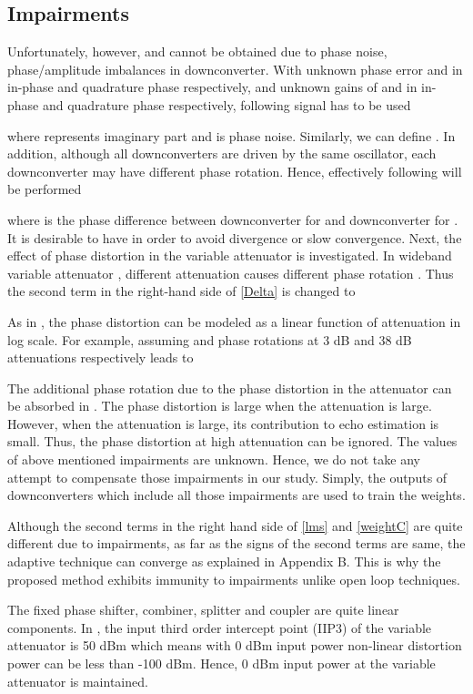 \documentclass[twocolumn]{IEEEtran}
\begin{document}
\subsection{Impairments}

Unfortunately, however,  and  cannot be
obtained due to phase noise, phase/amplitude imbalances in
downconverter. With unknown phase error  and
 in in-phase and quadrature phase respectively, and
unknown gains of  and  in in-phase and quadrature
phase respectively, following signal has to be used


where  represents
imaginary part and  is phase noise. Similarly, we can
define . In addition, although all
downconverters are driven by the same oscillator, each downconverter
may have different phase rotation. Hence, effectively following will
be performed


where  is the phase difference between downconverter
for  and downconverter for . It is desirable to
have  in order to avoid divergence or slow
convergence. Next, the effect of phase distortion in the variable
attenuator is investigated. In wideband variable attenuator
\cite{rfmd}, different attenuation causes different phase rotation
. Thus the second term in the right-hand side of
\eqref{Delta} is changed to


As in \cite{rfmd}, the phase distortion can be modeled as a linear
function of attenuation in log scale. For example, assuming
 and  phase rotations at 3 dB and 38 dB
attenuations respectively leads to


The additional phase rotation due to the phase distortion in the
attenuator can be absorbed in . The phase distortion
is large when the attenuation is large. However, when the
attenuation is large, its contribution to echo estimation is small.
Thus, the phase distortion at high attenuation can be ignored. The
values of above mentioned impairments are unknown. Hence, we do not
take any attempt to compensate those impairments in our study.
Simply, the outputs of downconverters which include all those
impairments are used to train the weights.

Although the second terms in the right hand side of \eqref{lms} and
\eqref{weightC} are quite different due to impairments, as far as
the signs of the second terms are same, the adaptive technique can
converge as explained in Appendix B. This is why the proposed method
exhibits immunity to impairments unlike open loop techniques.

The fixed phase shifter, combiner, splitter and coupler are quite
linear components. In \cite{rfmd}, the input third order intercept
point (IIP3) of the variable attenuator is 50 dBm which means with 0
dBm input power non-linear distortion power can be less than -100
dBm. Hence, 0 dBm input power at the variable attenuator is
maintained.
\end{document}
